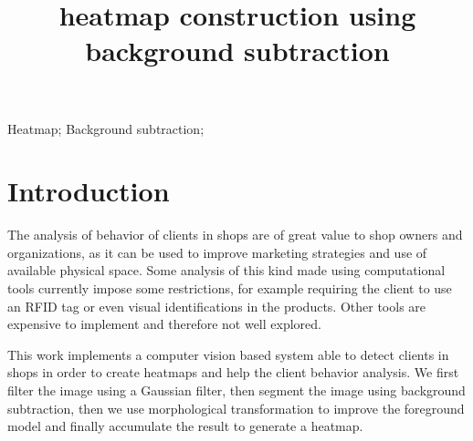 \documentclass[10pt, conference]{IEEEtran}
\begin{document}
	
	\title{heatmap construction using background subtraction}
	
	\newif\iffinal
	\finaltrue
	\newcommand{\jemsid}{99999}
	\author{%
		\and
	}
	
	\maketitle
	
	\begin{abstract}
	\end{abstract}
	
	\begin{IEEEkeywords}
		Heatmap; Background subtraction;
		
	\end{IEEEkeywords}
	
	\IEEEpeerreviewmaketitle
	
	\section{Introduction}
	The analysis of behavior of clients in shops are of great value to shop owners and organizations, as it can be used to improve marketing strategies and use of available physical space. Some analysis of this kind made using computational tools currently impose some restrictions, for example requiring the client to use an RFID tag or even visual identifications in the products. Other tools are expensive to implement and therefore not well explored.
	
	This work implements a computer vision based system able to detect clients in shops in order to create heatmaps and help the client behavior analysis. We first filter the image using a Gaussian filter, then segment the image using background subtraction, then we use morphological transformation to improve the foreground model and finally accumulate the result to generate a heatmap.
	
\end{document}
